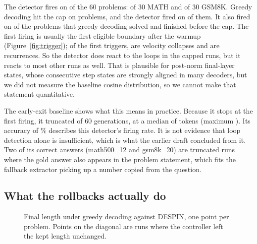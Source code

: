 \documentclass[11pt]{article}
\begin{document}
The detector fires on \statTrigAny{} of the 60 problems: \statTrigMath{} of 30 MATH and \statTrigGsm{} of 30 GSM8K. Greedy decoding hit the cap on \statGreedyCappedN{} problems, and the detector fired on \statGreedyCappedTrig{} of them. It also fired on \statHealthyTrig{} of the \statHealthyN{} problems that greedy decoding solved and finished before the cap. The first firing is usually the first eligible boundary after the warmup (Figure~\ref{fig:trigger}); of the \statFirstTrigN{} first triggers, \statVelFirst{} are velocity collapses and \statRecFirst{} are recurrences. So the detector does react to the loops in the capped runs, but it reacts to most other runs as well. That is plausible for post-norm final-layer states, whose consecutive step states are strongly aligned in many decoders, but we did not measure the baseline cosine distribution, so we cannot make that statement quantitative.

The early-exit baseline shows what this means in practice. Because it stops at the first firing, it truncated \statEarlyTruncated{} of 60 generations, at a median of \statEarlyMedianLen{} tokens (maximum \statEarlyMaxLen). Its accuracy of \statEarlyAcc\% describes this detector's firing rate. It is not evidence that loop detection alone is insufficient, which is what the earlier draft concluded from it. Two of its \statEarlyCorrect{} correct answers (math500\_12 and gsm8k\_20) are truncated runs where the gold answer also appears in the problem statement, which fits the fallback extractor picking up a number copied from the question.

\subsection{What the rollbacks actually do}

\begin{figure}[t]
\centering
{}
\caption{Final length under greedy decoding against DESPIN, one point per problem. Points on the diagonal are runs where the controller left the kept length unchanged.}
\label{fig:scatter}
\end{figure}
\end{document}
